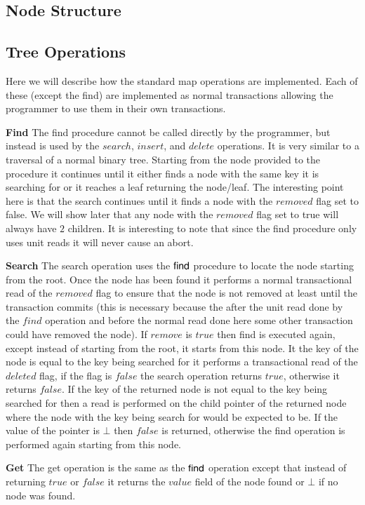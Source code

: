 \documentclass[10pt]{sigplanconf}
\begin{document}
\subsection{Node Structure}

\subsection{Tree Operations}
Here we will describe how the standard map operations are implemented.
Each of these (except the find) are implemented as normal transactions allowing the programmer to use them in their own transactions.

{\bf Find} The find procedure cannot be called directly by the programmer, but instead is used by the $search$, $insert$, and $delete$ operations.
It is very similar to a traversal of a normal binary tree.
Starting from the node provided to the procedure it continues until it either finds a node with the same key it is searching for or it reaches a leaf returning the node/leaf.
The interesting point here is that the search continues until it finds a node with the $removed$ flag set to false.
We will show later that any node with the $removed$ flag set to true will always have $2$ children.
It is interesting to note that since the find procedure only uses unit reads it will never cause an abort.

{\bf Search} The search operation uses the ${\sf find}$ procedure to locate the node starting from the root.
Once the node has been found it performs a normal transactional read of the $removed$ flag to ensure that the node is not removed at least until the transaction commits (this is necessary because the after the unit read done by the $find$ operation and before the normal read done here some other transaction could have removed the node).
If $remove$ is $true$ then find is executed again, except instead of starting from the root, it starts from this node.
It the key of the node is equal to the key being searched for it performs a transactional read of the $deleted$ flag, if the flag is $false$ the search operation returns $true$, otherwise it returns $false$.
If the key of the returned node is not equal to the key being searched for then a read is performed on the child pointer of the returned node where the node with the key being search for would be expected to be.
If the value of the pointer is $\bot$ then $false$ is returned, otherwise the find operation is performed again starting from this node.

{\bf Get} The get operation is the same as the ${\sf find}$ operation except that instead of returning $true$ or $false$ it returns the $value$ field of the node found or $\bot$ if no node was found.
\end{document}
